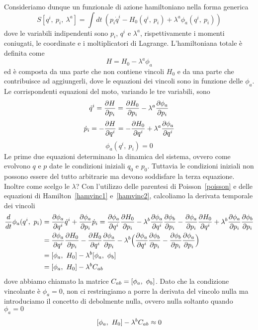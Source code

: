     Consideriamo dunque un funzionale di azione hamiltoniano nella forma generica
    \begin{equation} \label{azionevincolo}
        S[q^i,~p_i,~\lambda^a] = \int dt ~ (p_i \dot q^i - H_0(q^i, ~p_i) + \lambda^a \phi_a (q^i, ~p_i))
    \end{equation}
    dove le variabili indipendenti sono $p_i$, $q^i$ e $\lambda^a$, rispettivamente i momenti coniugati, le coordinate e i moltiplicatori di Lagrange. L'hamiltoniana totale è definita come 
    \begin{equation*}
        H = H_0 - \lambda^a \phi_a
    \end{equation*} 
    ed è composta da una parte che non contiene vincoli $H_0$ e da una parte che contribuisce ad aggiungerli, dove le equazioni dei vincoli sono in funzione delle $\phi_a$. Le corrispondenti equazioni del moto, variando le tre variabili, sono
    \begin{equation} \label{hamvinc1}
        \dot q^i = \frac{\partial H}{\partial p_i} = \frac{\partial H_0}{\partial p_i} - \lambda^a \frac{\partial\phi_a}{\partial p_i}
    \end{equation}
    \begin{equation} \label{hamvinc2}
        \dot p_i = - \frac{\partial H}{\partial q^i} = - \frac{\partial H_0}{\partial q^i} + \lambda^a \frac{\partial\phi_a}{\partial q^i}
    \end{equation} 
    \begin{equation} \label{hamvinc3}
        \phi_a(q^i, ~p_i) = 0
    \end{equation}
    Le prime due equazioni determinano la dinamica del sistema, ovvero come evolvono $q$ e $p$ date le condizioni iniziali $q_0$ e $p_0$. Tuttavia le condizioni iniziali non possono essere del tutto arbitrarie ma devono soddisfare la terza equazione. Inoltre come scelgo le $\lambda$? Con l'utilizzo delle parentesi di Poisson~\eqref{poisson} e delle equazioni di Hamilton~\eqref{hamvinc1} e~\eqref{hamvinc2}, calcoliamo la derivata temporale dei vincoli 
    \begin{equation} \label{dervinc}
    \begin{aligned}
        \frac{d}{dt} \phi_a(q^i, ~p_i) & = \frac{\partial\phi_a}{\partial q^i} \dot q^i + \frac{\partial\phi_a}{\partial p_i} \dot p_i = \frac{\partial\phi_a}{\partial q^i} \frac{\partial H_0}{\partial p_i} - \lambda^b \frac{\partial\phi_a}{\partial q^i} \frac{\partial\phi_b}{\partial p_i} - \frac{\partial\phi_a}{\partial p_i} \frac{\partial H_0}{\partial q^i} + \lambda^b \frac{\partial\phi_a}{\partial p_i} \frac{\partial\phi_b}{\partial p_i} \\ & = \frac{\partial\phi_a}{\partial q^i} \frac{\partial H_0}{\partial p_i} - \frac{\partial H_0}{\partial q^i} \frac{\partial\phi_a}{\partial p_i} - \lambda^b \Big ( \frac{\partial\phi_a}{\partial q^i} \frac{\partial\phi_b}{\partial p_i} -  \frac{\partial\phi_b}{\partial p_i} \frac{\partial\phi_a}{\partial p_i} \Big) \\ & = [\phi_a, ~H_0] - \lambda^b [\phi_a, ~\phi_b] \\ & = [\phi_a, ~H_0] - \lambda^b C_{ab}
    \end{aligned}
    \end{equation}
    dove abbiamo chiamato la matrice $C_{ab} = [\phi_a, ~\phi_b]$. Dato che la condizione vincolante è $\phi_a = 0$, non ci restringiamo a porre la derivata del vincolo nulla ma introduciamo il concetto di debolmente nulla, ovvero nulla soltanto quando $\phi_a = 0$
    \begin{equation} \label{vincoli}
        [\phi_a, ~H_0] - \lambda^b C_{ab} \approx 0
    \end{equation}


